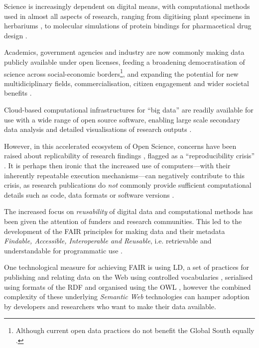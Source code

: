 Science is increasingly dependent on digital means, with computational methods used in almost all aspects of research, ranging from digitising plant specimens in herbariums \cite{Thiers 2016}, to molecular simulations of protein bindings for pharmacetical drug design \cite{Sledz 2018}. 

Academics, government agencies and industry are now commonly making data publicly available under open licenses, feeding a broadening democratisation of science \cite{Kitchin 2021} across social-economic borders\footnote{Although current open data practices do not benefit the Global South equally \cite{Serwadda 2018}.}, and expanding the potential for new multidiciplinary fields, commercialisation, citizen engagement and wider societal benefits \cite{Bisol 2014}.

Cloud-based computational infrastructures for ``big data'' are readily available for use with a wide range of open source software, enabling large scale secondary data analysis and detailed visualisations of research outputs \cite{Hashem 2015}.

However, in this accelerated ecosystem of Open Science, concerns have been raised about replicability of research findings \cite{Ioannidis 2005}, flagged as a ``reproducibility crisis'' \cite{Baker 2016}. It is perhaps then ironic that the increased use of computers---with their inherently repeatable execution mechanisms---can negatively contribute to this crisis, as research publications do \emph{not} commonly provide sufficient computational details such as code, data formats or software versions \cite{Stodden 2016}.

The increased focus on \emph{reusability} of digital data and computational methods has been given the attention of funders and research communities. This led to the development of the \acrshort{FAIR} principles for making data and their metadata \emph{Findable, Accessible, Interoperable and Reusable}, i.e. retrievable and understandable for programmatic use \cite{Wilkinson 2016}.

One technological measure for achieving FAIR is using \acrlong{LD}, a set of practices for publishing and relating data on the Web using controlled vocabularies \cite{Berners-Lee 2006}, serialised using formats of the \acrfull{RDF} \cite{Schreiber 2014} and organised using the \acrfull{OWL} \cite{W3C 2012}, however the combined complexity of these underlying \emph{Semantic Web} technologies can hamper adoption by developers \cite{Klímek 2019} and researchers who want to make their data available.

